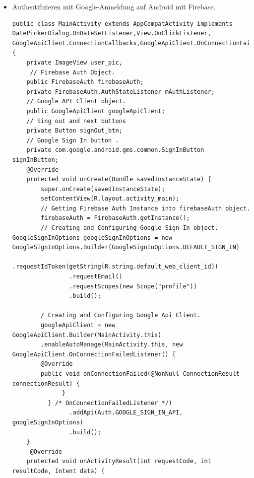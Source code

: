 \begin{itemize}
\begin{lstlisting}[frame=single]
        ObjectMapper mapper = new ObjectMapper();
        String jsonKey = json.fields().next().getKey();
        //------------------Message Type --------------
        switch (jsonKey) {
        case "Replay message":
             c.getWebSocket().send(ToJson.message("Start","I want to start")
             .toString() +"\n");
        break;
        case "Start":
            c.getWebSocket().send(ToJson.message("Client", "Thanks")
            .toString() + "\n");  
            c.getWebSocket().send(ToJson.message("PERSONALSLIST",
            "I NEED PERSONAL LIST").toString() +"\n");
        break;
           }
       }
  }
 
\end{lstlisting}
\item Authentifizieren mit Google-Anmeldung auf Android mit Firebase.\\
\begin{lstlisting}[frame=single]
public class MainActivity extends AppCompatActivity implements DatePickerDialog.OnDateSetListener,View.OnClickListener,  GoogleApiClient.ConnectionCallbacks,GoogleApiClient.OnConnectionFailedListener {
    private ImageView user_pic,
	 // Firebase Auth Object.
    public FirebaseAuth firebaseAuth;
    private FirebaseAuth.AuthStateListener mAuthListener;
    // Google API Client object.
    public GoogleApiClient googleApiClient;
    // Sing out and next buttons
    private Button signOut_btn;
    // Google Sign In button .
    private com.google.android.gms.common.SignInButton signInButton;
    @Override
    protected void onCreate(Bundle savedInstanceState) {
    	super.onCreate(savedInstanceState);
        setContentView(R.layout.activity_main);
        // Getting Firebase Auth Instance into firebaseAuth object.
        firebaseAuth = FirebaseAuth.getInstance();
        // Creating and Configuring Google Sign In object.
GoogleSignInOptions googleSignInOptions = new GoogleSignInOptions.Builder(GoogleSignInOptions.DEFAULT_SIGN_IN)
                .requestIdToken(getString(R.string.default_web_client_id))
                .requestEmail()
                .requestScopes(new Scope("profile"))
                .build();
                
        / Creating and Configuring Google Api Client.
        googleApiClient = new GoogleApiClient.Builder(MainActivity.this)
        .enableAutoManage(MainActivity.this, new GoogleApiClient.OnConnectionFailedListener() {
        @Override
        public void onConnectionFailed(@NonNull ConnectionResult connectionResult) {
              }
          } /* OnConnectionFailedListener */)
                .addApi(Auth.GOOGLE_SIGN_IN_API, googleSignInOptions)
                .build();
    }
     @Override
    protected void onActivityResult(int requestCode, int resultCode, Intent data) {


\end{lstlisting}
\end{itemize}
